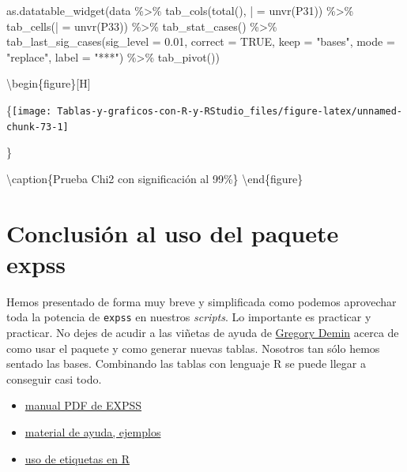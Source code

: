 \documentclass[
]{book}
\newenvironment{Shaded}{\begin{snugshade}}{\end{snugshade}}
\newcommand{\AttributeTok}[1]{\textcolor[rgb]{0.77,0.63,0.00}{#1}}
\newcommand{\ConstantTok}[1]{\textcolor[rgb]{0.00,0.00,0.00}{#1}}
\newcommand{\FloatTok}[1]{\textcolor[rgb]{0.00,0.00,0.81}{#1}}
\newcommand{\FunctionTok}[1]{\textcolor[rgb]{0.00,0.00,0.00}{#1}}
\newcommand{\NormalTok}[1]{#1}
\newcommand{\OtherTok}[1]{\textcolor[rgb]{0.56,0.35,0.01}{#1}}
\newcommand{\SpecialCharTok}[1]{\textcolor[rgb]{0.00,0.00,0.00}{#1}}
\newcommand{\StringTok}[1]{\textcolor[rgb]{0.31,0.60,0.02}{#1}}
\providecommand{\tightlist}{%
  \setlength{\itemsep}{0pt}\setlength{\parskip}{0pt}}
\begin{document}
\begin{Shaded}
\begin{Highlighting}[]
\FunctionTok{as.datatable\_widget}\NormalTok{(data }\SpecialCharTok{\%\textgreater{}\%}
  \FunctionTok{tab\_cols}\NormalTok{(}\FunctionTok{total}\NormalTok{(), }\StringTok{\textasciigrave{}}\AttributeTok{|}\StringTok{\textasciigrave{}} \OtherTok{=} \FunctionTok{unvr}\NormalTok{(P31)) }\SpecialCharTok{\%\textgreater{}\%}
  \FunctionTok{tab\_cells}\NormalTok{(}\StringTok{\textasciigrave{}}\AttributeTok{|}\StringTok{\textasciigrave{}} \OtherTok{=} \FunctionTok{unvr}\NormalTok{(P33)) }\SpecialCharTok{\%\textgreater{}\%}
  \FunctionTok{tab\_stat\_cases}\NormalTok{() }\SpecialCharTok{\%\textgreater{}\%}
  \FunctionTok{tab\_last\_sig\_cases}\NormalTok{(}\AttributeTok{sig\_level =} \FloatTok{0.01}\NormalTok{, }\AttributeTok{correct =} \ConstantTok{TRUE}\NormalTok{,}
    \AttributeTok{keep =} \StringTok{"bases"}\NormalTok{, }\AttributeTok{mode =} \StringTok{"replace"}\NormalTok{, }\AttributeTok{label =} \StringTok{"***"}\NormalTok{) }\SpecialCharTok{\%\textgreater{}\%}
  \FunctionTok{tab\_pivot}\NormalTok{())}
\end{Highlighting}
\end{Shaded}

\textbackslash begin\{figure\}{[}H{]}

\{\centering \texttt{[image: Tablas-y-graficos-con-R-y-RStudio\_files/figure-latex/unnamed-chunk-73-1]}

\}

\textbackslash caption\{Prueba Chi2 con significación al 99\%\}\label{fig:unnamed-chunk-73}
\textbackslash end\{figure\}

\hypertarget{conclusiuxf3n-al-uso-del-paquete-expss}{%
\section{Conclusión al uso del paquete expss}\label{conclusiuxf3n-al-uso-del-paquete-expss}}

Hemos presentado de forma muy breve y simplificada como podemos aprovechar toda la potencia de \texttt{expss} en nuestros \emph{scripts}. Lo importante es practicar y practicar. No dejes de acudir a las viñetas de ayuda de \href{http://gdemin.github.io/expss/}{Gregory Demin} acerca de como usar el paquete y como generar nuevas tablas. Nosotros tan sólo hemos sentado las bases. Combinando las tablas con lenguaje R se puede llegar a conseguir casi todo.

\begin{itemize}
\tightlist
\item
  \href{https://cran.r-project.org/web/packages/expss/expss.pdf}{manual PDF de EXPSS}
\item
  \href{https://cran.r-project.org/web/packages/expss/vignettes/tables-with-labels.html}{material de ayuda, ejemplos}
\item
  \href{https://cran.r-project.org/web/packages/expss/vignettes/labels-support.html}{uso de etiquetas en R}
\end{itemize}
\end{document}
